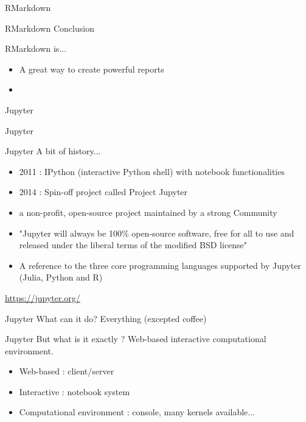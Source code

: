 \begin{frame}{RMarkdown}
\end{frame}

\begin{frame}{RMarkdown}
Conclusion \newline

RMarkdown is...

\begin{itemize}
    \item A great way to create powerful reports
    \item 
\end{itemize}

\end{frame}

\begin{frame}{Jupyter}

\huge{Jupyter}

\end{frame}

\begin{frame}{Jupyter}
A bit of history...
\begin{itemize}
    \item 2011 : IPython (interactive Python shell) with notebook functionalities
    \item 2014 : Spin-off project called Project Jupyter
    \item a non-profit, open-source project maintained by a strong Community
    \item "Jupyter will always be 100\% open-source software, free for all to use and released under the liberal terms of the modified BSD license"
    \item A reference to the three core programming languages supported by Jupyter (Julia, Python and R)
\end{itemize}

\url{https://jupyter.org/}

\end{frame}

\begin{frame}{Jupyter}
What can it do? \newline \pause
Everything (excepted coffee)
\end{frame}

\begin{frame}{Jupyter}
But what is it exactly ? \newline \pause
Web-based interactive computational environment. \newline \pause
\begin{itemize}
    \item<3-> Web-based : client/server
    \item<4-> Interactive : notebook system
    \item<5-> Computational environment : console, many kernels available...
\end{itemize}
\end{frame}


